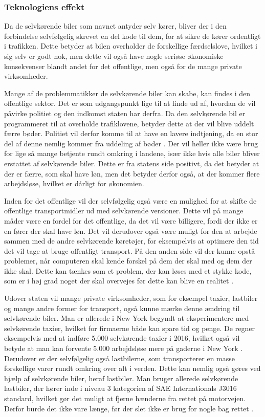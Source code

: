 \subsubsection{Teknologiens effekt}
Da de selvkørende biler som navnet antyder selv kører, bliver der i den forbindelse selvfølgelig skrevet en del kode til dem, for at sikre de kører ordentligt i trafikken. Dette betyder at bilen overholder de forskellige færdselslove, hvilket i sig selv er godt nok, men dette vil også have nogle seriøse økonomiske konsekvenser blandt andet for det offentlige, men også for de mange private virksomheder. 

Mange af de problemmatikker de selvkørende biler kan skabe, kan findes i den offentlige sektor. Det er som udgangspunkt lige til at finde ud af, hvordan de vil påvirke politiet og den indkomst staten har derfra. Da den selvkørende bil er programmeret til at overholde trafiklovene, betyder dette at der vil blive uddelt færre bøder. Politiet vil derfor komme til at have en lavere indtjening, da en stor del af denne nemlig kommer fra uddeling af bøder \cite{B}. Der vil heller ikke være brug for lige så mange betjente rundt omkring i landene, især ikke hvis alle biler bliver erstattet af selvkørende biler. Dette er fra statens side positivt, da det betyder at der er færre, som skal have løn, men det betyder derfor også, at der kommer flere arbejdsløse, hvilket er dårligt for økonomien.

Inden for det offentlige vil der selvfølgelig også være en mulighed for at skifte de offentlige transportmidler ud med selvkørende versioner. Dette vil på mange måder være en fordel for det offentlige, da det vil være billigere, fordi der ikke er en fører der skal have løn. Det vil derudover også være muligt for den at arbejde sammen med de andre selvkørende køretøjer, for eksempelvis at optimere den tid det vil tage at bruge offentligt transport. På den anden side vil der kunne opstå problemer, når computeren skal kende forskel på dem der skal med og dem der ikke skal. Dette kan tænkes som et problem, der kan løses med et stykke kode, som er i høj grad noget der skal overvejes før dette kan blive en realitet \cite{BUS}.

Udover staten vil mange private virksomheder, som for eksempel taxier, lastbiler og mange andre former for transport, også kunne mærke denne ændring til selvkørende biler. Man er allerede i New York begyndt at eksperimentere med selvkørende taxier, hvilket for firmaerne både kan spare tid og penge. De regner eksempelvis med at indføre 5.000 selvkørende taxier i 2016, hvilket også vil betyde at man kan forvente 5.000 arbejdsløse mere på gaderne i New York \cite{TAXI}. \\Derudover er der selvfølgelig også lastbilerne, som transporterer en masse forskellige varer rundt omkring over alt i verden. Dette kan nemlig også gøres ved hjælp af selvkørende biler, heraf lastbiler. Man bruger allerede selvkørende lastbiler, der hører inde i niveau 3 kategorien af SAE Internationals J3016 standard, hvilket gør det muligt at fjerne hænderne fra rettet på motorvejen. Derfor burde det ikke vare længe, før der slet ikke er brug for nogle bag rettet \cite{TRUCKS}. 

